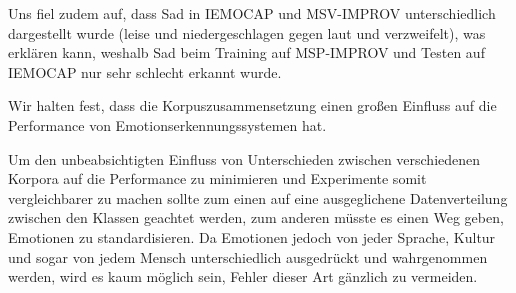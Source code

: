 \documentclass{article} %
\begin{document}
Uns fiel zudem auf, dass Sad in IEMOCAP und MSV-IMPROV unterschiedlich dargestellt wurde (leise und niedergeschlagen gegen laut und verzweifelt), was erklären kann, weshalb Sad beim Training auf MSP-IMPROV und Testen auf IEMOCAP nur sehr schlecht erkannt wurde. 

Wir halten fest, dass die Korpuszusammensetzung einen großen Einfluss auf die Performance von Emotionserkennungssystemen hat. 

Um den unbeabsichtigten Einfluss von Unterschieden zwischen verschiedenen Korpora auf die Performance zu minimieren und Experimente somit vergleichbarer zu machen sollte zum einen auf eine ausgeglichene Datenverteilung zwischen den Klassen geachtet werden, zum anderen müsste es einen Weg geben, Emotionen zu standardisieren. Da Emotionen jedoch von jeder Sprache, Kultur und sogar von jedem Mensch unterschiedlich ausgedrückt und wahrgenommen werden, wird es kaum möglich sein, Fehler dieser Art gänzlich zu vermeiden.
\pagebreak
\tableofcontents
\pagebreak


\end{document}
